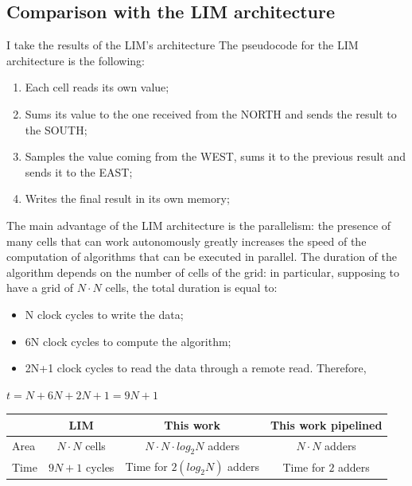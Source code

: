 \subsection{Comparison with the LIM architecture}
I take the results of the LIM's architecture
 The pseudocode for the LIM architecture is the following:
 \begin{enumerate}
 	\item Each cell reads its own value;
 	\item Sums its value to the one received from the NORTH and sends the result to the SOUTH;
 	\item Samples the value coming from the WEST, sums it to the previous result and sends it to the EAST;
 	\item Writes the final result in its own memory;
\end{enumerate}
 The main advantage of the LIM architecture is the parallelism: the presence of many cells that can work autonomously greatly increases the speed of the computation of algorithms that can be executed in parallel.
  The duration of the algorithm depends on the number of cells of the grid: in particular, supposing to have a grid of $ N \cdot N  $ cells, the total duration is equal to:
  \begin{itemize}
  	\item N clock cycles to write the data; 
  	\item 6N clock cycles to compute the algorithm; 
  	\item 2N+1 clock cycles to read the data through a remote read. Therefore,
  	
  \end{itemize} 
  \begin{center}
  	$ t = N +6N +2N +1=9N +1 $
  \end{center}
  
  	 \begin{center}
  	 	\begin{tabular}{ | p{1.7cm} | c | c | c |}
  	 		
  	 		\hline
  	 		\label{table:iia2_tab} & LIM & This work & This work pipelined\\
  	 		\hline
  	 		Area & $ N\cdotp N$ cells  &  $ N\cdotp N\cdotp log_2 N $ adders  & $ N\cdotp N $ adders\\
  	 		\hline
  	 		Time & $ 9N +1  $ cycles
  	 		&
  	 		Time for $ 2(log_2 N) $ adders &Time for $ 2 $ adders\\
  	 		
  	 		\hline
  	 		
  	 	\end{tabular}
  	 \end{center}
